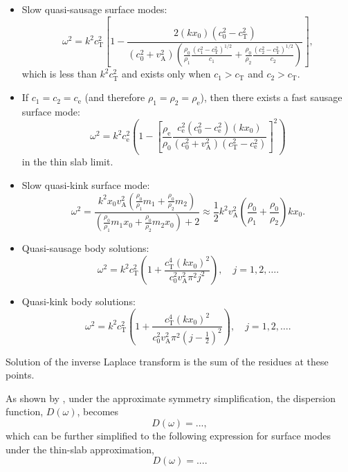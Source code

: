 \documentclass[12pt]{article}
\begin{document}
\begin{itemize}
	\item Slow quasi-sausage surface modes:
	\begin{equation}
		\omega^2=k^2c_\textrm{T}^2\left[1-\frac{2(kx_0)(c_0^2-c_\textrm{T}^2)}{(c_0^2+v_\textrm{A}^2)\left(\frac{\rho_0}{\rho_1}\frac{(c_1^2-c_\textrm{T}^2)^{1/2}}{c_1}+\frac{\rho_0}{\rho_2}\frac{(c_2^2-c_\textrm{T}^2)^{1/2}}{c_2}\right)}\right],
		\label{thinslab slow saus surf}
	\end{equation}
	which is less than $k^2c_\textrm{T}^2$ and exists only when $c_1>c_\textrm{T}$ and $c_2>c_\textrm{T}$.
	\item If $c_1=c_2=c_\textrm{e}$ (and therefore $\rho_1=\rho_2=\rho_\textrm{e}$), then there exists a fast sausage surface mode:
	\begin{equation}
		\omega^2=k^2c_\textrm{e}^2\left(1-\left[\frac{\rho_\textrm{e}}{\rho_0}\frac{c_\textrm{e}^2(c_0^2-c_\textrm{e}^2)(kx_0)}{(c_0^2+v_\textrm{A}^2)(c_\textrm{T}^2-c_\textrm{e}^2)}\right]^2\right)
		\label{thinslab fast saus surf}
	\end{equation}
	in the thin slab limit.
	\item Slow quasi-kink surface mode:
	\begin{equation}
		\omega^2=\frac{k^2x_0v_\textrm{A}^2\left(\frac{\rho_0}{\rho_1}m_1+\frac{\rho_0}{\rho_2}m_2\right)}{\left(\frac{\rho_0}{\rho_1}m_1x_0+\frac{\rho_0}{\rho_2}m_2x_0\right)+2}\approx{}\frac{1}{2}k^2v_\textrm{A}^2\left(\frac{\rho_0}{\rho_1}+\frac{\rho_0}{\rho_2}\right)kx_0.
		\label{thinslab slow kink surf}
	\end{equation}
	\item Quasi-sausage body solutions:
	\begin{equation}
		\omega^2=k^2c_\textrm{T}^2\left(1+\frac{c_\textrm{T}^4(kx_0)^2}{c_0^2v_\textrm{A}^2\pi^2j^2}\right), \quad j=1,2,\ldots. \label{thinslab saus body}
	\end{equation}
	\item Quasi-kink body solutions:
	\begin{equation}
		\omega^2=k^2c_\textrm{T}^2\left(1+\frac{c_\textrm{T}^4(kx_0)^2}{c_0^2v_\textrm{A}^2\pi^2(j-\frac{1}{2})^2}\right), \quad j=1,2,\ldots. \label{thinslab kink body}
	\end{equation}
\end{itemize}

Solution of the inverse Laplace transform is the sum of the residues at these points.

As shown by \citep{all_etal17}, under the approximate symmetry simplification, the dispersion function, $D(\omega)$, becomes
\begin{equation}
D(\omega) = ... ,
\end{equation}
which can be further simplified to the following expression for surface modes under the thin-slab approximation,
\begin{equation}
D(\omega) = ... .
\end{equation}
\end{document}
